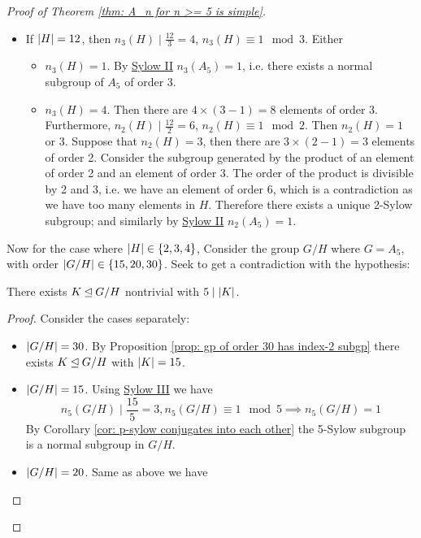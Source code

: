 \documentclass{article}
\begin{document}
\begin{proof}[Proof of Theorem \ref{thm: A_n for n >= 5 is simple}]
\begin{itemize}
\begin{enumerate}
            \begin{itemize}
                \item If $\left|H\right| = 12$, then $n_3(H) \mid \frac{12}{3} = 4$, $n_3(H) \equiv 1 \mod{3}$. Either
                \begin{itemize}
                    \item $n_3(H) = 1$. By \hyperref[thm: Sylow II]{Sylow II} $n_3(A_5) = 1$, i.e. there exists a normal subgroup of $A_5$ of order 3.
                    \item $n_3(H) = 4$. Then there are $4 \times (3 - 1) = 8$ elements of order 3. Furthermore, $n_2(H) \mid \frac{12}{2} = 6$, $n_2(H) \equiv 1 \mod{2}$. Then $n_2(H) = 1$ or $3$. Suppose that $n_2(H) = 3$, then there are $3 \times (2 - 1) = 3$ elements of order 2. Consider the subgroup generated by the product of an element of order 2 and an element of order 3. The order of the product is divisible by 2 and 3, i.e. we have an element of order 6, which is a contradiction as we have too many elements in $H$. Therefore there exists a unique 2-Sylow subgroup; and similarly by \hyperref[thm: Sylow II]{Sylow II} $n_2(A_5) = 1$.
                \end{itemize}
            \end{itemize}
            Now for the case where $\left|H\right| \in \{2, 3, 4\}$, Consider the group $G/H$ where $G = A_5$, with order $\left|G/H\right| \in \{15, 20, 30\}$. Seek to get a contradiction with the hypothesis:
            \begin{claim}
                There exists $K \unlhd G/H$ nontrivial with $5 \mid \left|K\right|$.
            \end{claim}
            \begin{proof}
                Consider the cases separately:
                \begin{itemize}
                    \item $\left|G/H\right| = 30$. By Proposition \ref{prop: gp of order 30 has index-2 subgp} there exists $K \unlhd G/H$ with $\left|K\right| = 15$.
                    \item $\left|G/H\right| = 15$. Using \hyperref[thm: Sylow III]{Sylow III} we have
                    \[
                        n_5(G/H)\mid \frac{15}{5} = 3, n_5(G/H) \equiv 1 \mod{5} \implies n_5(G/H) = 1
                    \]
                    By Corollary \ref{cor: p-sylow conjugates into each other} the 5-Sylow subgroup is a normal subgroup in $G/H$.
                    \item $\left|G/H\right| = 20$. Same as above we have

\end{itemize}
\end{proof}
\end{enumerate}
\end{itemize}
\end{proof}
\end{document}
